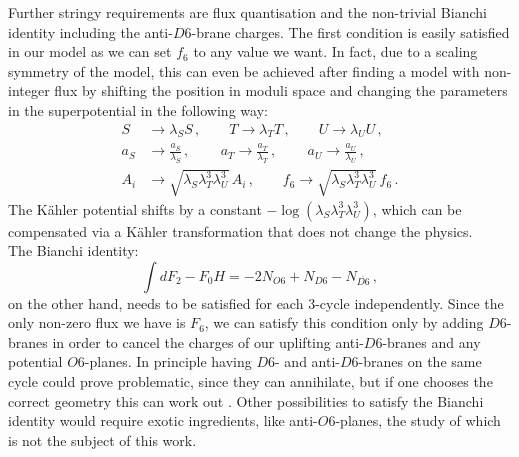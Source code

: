 \documentclass[a4paper,12pt,twoside,openright]{report}
\newcommand{\be}{\begin{equation}}
\newcommand{\ee}{\end{equation}}
\newcommand{\bea}{\begin{equation}\begin{aligned}}
\newcommand{\eea}{\end{aligned}\end{equation}}
\begin{document}
Further stringy requirements are flux quantisation and the non-trivial Bianchi identity including the anti-$D6$-brane charges. The first condition is easily satisfied in our model as we can set $f_6$ to any value we want. In fact, due to a scaling symmetry of the model, this can even be achieved after finding a model with non-integer flux by shifting the position in moduli space and  changing the parameters in the superpotential in the following way:
\bea 
S &\to \lambda_S S\,, \qquad T \to \lambda_T T\,, \qquad U\to \lambda_U U\,,\\
a_S &\to \frac{a_S }{\lambda_S}\,,\qquad\, a_T \to \frac{a_T }{\lambda_T}\,,\qquad\, a_U \to \frac{a_U }{\lambda_U}\,,\\
A_i &\to \sqrt{\lambda_S \lambda_T^3 \lambda_U^3}\, A_i\,,\qquad f_6 \to \sqrt{\lambda_S \lambda_T^3 \lambda_U^3}\, f_6\,.
\eea
The Kähler potential shifts by a constant $-\log (\lambda_S \lambda_T^3 \lambda_U^3)$, which can be compensated via a Kähler transformation that does not change the physics.\\
The Bianchi identity:
\be 
\int dF_2 - F_0 H = -2 N_{O6} + N_{D6} - N_{\overline{D6}}\,,
\ee
on the other hand, needs to be satisfied for each 3-cycle independently. Since the only non-zero flux we have is $F_6$, we can satisfy this condition only by adding $D6$-branes in order to cancel the charges of our uplifting anti-$D6$-branes and any potential $O6$-planes. In principle having $D6$- and anti-$D6$-branes on the same cycle could prove problematic, since they can annihilate, but if one chooses the correct geometry this can work out \cite{Retolaza:2015sta}. Other possibilities to satisfy the Bianchi identity would require exotic ingredients, like anti-$O6$-planes, the study of which is not the subject of this work.
\end{document}

